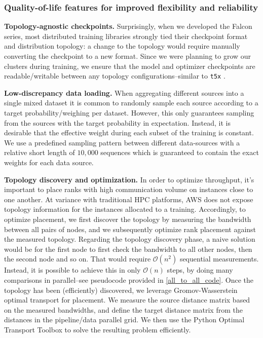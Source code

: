 \documentclass{article}
\begin{document}
\subsubsection{Quality-of-life features for improved flexibility and reliability}

\textbf{Topology-agnostic checkpoints.} Surprisingly, when we developed the Falcon series, most distributed training libraries strongly tied their checkpoint format and distribution topology: a change to the topology would require manually converting the checkpoint to a new format. Since we were planning to grow our clusters during training, we ensure that the model and optimizer checkpoints are readable/writable between any topology configurations--similar to \texttt{t5x} \citep{t5x}. 

\textbf{Low-discrepancy data loading.} When aggregating different sources into a single mixed dataset it is common to randomly sample each source according to a target probability/weighing per dataset. However, this only guarantees sampling from the sources with the target probability in expectation. Instead, it is desirable that the effective weight during each subset of the training is constant. We use a predefined sampling pattern between different data-sources with a relative short length of $10,000$ sequences which is guaranteed to contain the exact weights for each data source. 

\textbf{Topology discovery and optimization.}  In order to optimize throughput, it's important to place ranks with high communication volume on instances close to one another. At variance with traditional HPC platforms, AWS does not expose topology information for the instances allocated to a training. Accordingly, to optimize placement, we first discover the topology by measuring the bandwidth between all pairs of nodes, and we subsequently optimize rank placement against the measured topology. Regarding the topology discovery phase, a naive solution would be for the first node to first check the bandwidth to all other nodes, then the second node and so on. That would require $\mathcal{O}(n^2)$ sequential measurements. Instead, it is possible to achieve this in only $\mathcal{O}(n)$ steps, by doing many comparisons in parallel--see pseudocode provided in \ref{all_to_all_code}. Once the topology has been (efficiently) discovered, we leverage Gromov-Wasserstein optimal transport \citep{gromov-wasserstein} for placement. We measure the source distance matrix based on the measured bandwidths, and define the target distance matrix from the distances in the pipeline/data parallel grid.  We then use the Python Optimal Transport Toolbox \citep{POT} to solve the resulting problem efficiently. 
\end{document}
